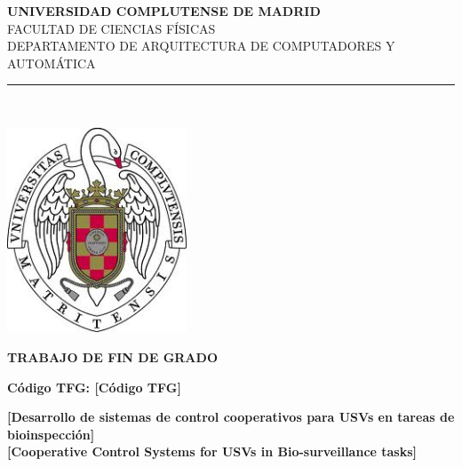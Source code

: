 \begin{center}

   \vspace{1cm}


   {\Large \textbf{UNIVERSIDAD COMPLUTENSE DE MADRID}}\\

   \vspace{0.3cm}
   {\Large FACULTAD DE CIENCIAS FÍSICAS}\\
   \vspace{0.3cm}
   {DEPARTAMENTO DE ARQUITECTURA DE COMPUTADORES Y AUTOMÁTICA}\\

   

   \vspace{0.65cm}
   \rule{2in}{0.5pt}\\
   \vspace{0.85cm}

\vspace{0.5cm}

  \includegraphics[height=2.4in]{figures/escudo.jpg}

   \vspace{0.5cm}  
  {\large \textbf{TRABAJO DE FIN DE GRADO}}\\ 

  \vspace{0.3cm} 

  \textbf{Código TFG: [Código TFG]}\\
  
   \vspace{0.5cm}
     
  \textbf{[Desarrollo de sistemas de control cooperativos para USVs en tareas de bioinspección]}\\
  \vspace{0.3cm}  
  \textbf{[Cooperative Control Systems for USVs in Bio-surveillance tasks]}


\end{center}
